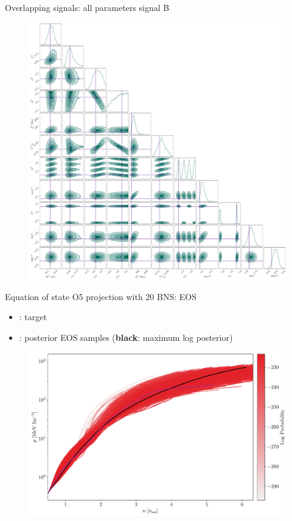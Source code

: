 \documentclass[usenames,dvipsnames,t]{beamer}
\begin{document}
\begin{frame}{Overlapping signals: all parameters signal B}
  \vspace{-3mm}
  \begin{figure}
    \centering
    \includegraphics[scale=0.1325]{Figures/OS_injection_139_v2_2_cornerplot_all.pdf}
  \end{figure}
\end{frame}

\begin{frame}{Equation of state O5 projection with 20 BNS: EOS}

  \vspace{-2mm}
  \begin{itemize}
    \item \textbf{}: target
    \item \textbf{}: posterior EOS samples (\textbf{black}: maximum log posterior)
  \end{itemize}

  \begin{figure}
    \centering
    \includegraphics[scale=0.40]{Figures/postprocessing_EOS.pdf}
  \end{figure}
\end{frame}
\end{document}
